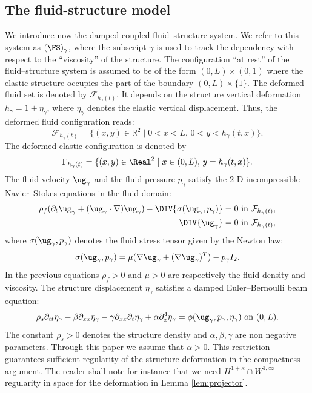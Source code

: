 \subsection{The fluid-structure model}
We introduce now the damped coupled fluid--structure system. We refer to
this system as $(\FS)_{\gamma}$, where the subscript $\gamma$ is used to track the dependency with respect to the ``viscosity'' of the structure. The configuration ``at rest'' of the fluid--structure system is assumed to be of the form $(0, L)\times (0, 1)$ where the elastic structure occupies the part of the boundary $(0, L)\times \{1\}$. The deformed fluid set is denoted by $\mathcal{F}_{h_{\gamma}(t)}$. It depends on the structure vertical deformation $h_{\gamma}=1+\eta_\gamma$, where $\eta_\gamma$ denotes the elastic vertical displacement.
Thus, the deformed fluid configuration reads:\vspace*{-3pt}\enlargethispage{.5\baselineskip}%
\begin{equation}\label{fluid.domain}
\mathcal{F}_{h_{\gamma}(t)}=\{(x,y)\in\mathbb{R}^{2}\mid 0<x<L,\,0<y<h_{\gamma}(t,x)\}.
\end{equation}
The deformed elastic configuration is denoted by
\[
\Gamma_{h_{\gamma}(t)}=\{(x,y)\in\Real^{2}\mid x\in(0,L),\,y=h_{\gamma}(t,x)\}.
\]
The fluid velocity $\ug_{\gamma}$ and the fluid pressure $p_{\gamma}$ satisfy the $2$-D incompressible Navier--Stokes equations in the fluid domain:
\begin{equation}\label{Navier-Stokes}
\begin{aligned}
\rho_{f}(\partial_{t}\ug_{\gamma} + (\ug_{\gamma}\cdot\nabla)\ug_{\gamma}) - \DIV{\sigma(\ug_{\gamma},p_{\gamma})} &{}= 0\text{ in }\mathcal{F}_{h_{\gamma}(t)},\\
\DIV{\ug_{\gamma}}&{}=0\text{ in }\mathcal{F}_{h_{\gamma}(t)},
\end{aligned}
\end{equation}
where $\sigma(\ug_{\gamma},p_{\gamma})$ denotes the fluid stress tensor given by the Newton law:
\[\sigma(\ug_{\gamma},p_{\gamma})=\mu(\nabla\ug_{\gamma} +( \nabla\ug_{\gamma})^{T}) -p_{\gamma}I_{2}.\]
In the previous equations $\rho_{f}>0$ and $\mu>0$ are respectively the fluid density and viscosity. The structure displacement $\eta_{\gamma}$ satisfies a damped Euler--Bernoulli beam equation:\vspace*{-3pt}
\begin{equation}\label{Beam.equation}
\rho_{s}\partial_{tt}\eta_{\gamma}-\beta\partial_{xx}\eta_{\gamma}-\gamma\partial_{xx}\partial_{t}\eta_{\gamma}+\alpha\partial_{x}^4\eta_{\gamma}=\phi(\ug_{\gamma},p_{\gamma},\eta_{\gamma})\text{ on }(0,L).
\end{equation}
The constant $\rho_{s}>0$ denotes the structure density and $\alpha,\beta,\gamma$ are non negative parameters.
Through this paper we assume that $\alpha>0$.
This restriction guarantees sufficient regularity of the structure deformation in the compactness argument. The reader shall note for instance that we need $H^{1+\kappa} \cap W^{1,\infty}$ regularity in space for the deformation in Lemma \ref{lem:projector}.

